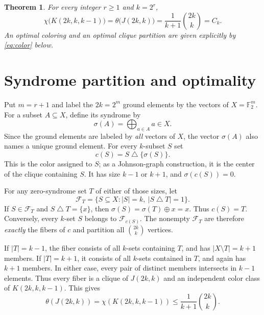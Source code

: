 \documentclass[11pt]{article}
\newtheorem{theorem}{Theorem}
\newcommand{\F}{\mathbb F}
\newcommand{\calF}{\mathcal F}
\newcommand{\sig}{\sigma}
\begin{document}
\begin{theorem}\label{thm:main}
For every integer $r\geq1$ and $k=2^r$,
\[
 \chi\bigl(K(2k,k,k-1)\bigr)
 =\theta\bigl(J(2k,k)\bigr)
 =\frac{1}{k+1}\binom{2k}{k}=C_k.
\]
An optimal coloring and an optimal clique partition are given explicitly by \eqref{eq:color} below.
\end{theorem}

\section{Syndrome partition and optimality}
Put $m=r+1$ and label the $2k=2^m$ ground elements by the vectors of $X=\F_2^m$.  For a subset $A\subseteq X$, define its syndrome by
\[
 \sig(A)=\bigoplus_{a\in A}a\in X.
\]
Since the ground elements are labeled by \emph{all} vectors of $X$, the vector $\sig(A)$ also names a unique ground element.  For every $k$-subset $S$ set
\begin{equation}\label{eq:color}
                 c(S)=S\mathbin{\triangle}\{\sig(S)\}.
\end{equation}
This is the color assigned to $S$; as a Johnson-graph construction, it is the center of the clique containing $S$.  It has size $k-1$ or $k+1$, and $\sig(c(S))=0$.

For any zero-syndrome set $T$ of either of those sizes, let
\[
 \calF_T=\{S\subseteq X: |S|=k,\ |S\mathbin{\triangle}T|=1\}.
\]
If $S\in\calF_T$ and $S\mathbin{\triangle}T=\{x\}$, then
$\sig(S)=\sig(T)\oplus x=x$.  Thus $c(S)=T$.  Conversely, every $k$-set $S$ belongs to $\calF_{c(S)}$.  The nonempty $\calF_T$ are therefore \emph{exactly} the fibers of $c$ and partition all $\binom{2k}{k}$ vertices.

If $|T|=k-1$, the fiber consists of all $k$-sets containing $T$, and has $|X\setminus T|=k+1$ members.  If $|T|=k+1$, it consists of all $k$-sets contained in $T$, and again has $k+1$ members.  In either case, every pair of distinct members intersects in $k-1$ elements.  Thus every fiber is a clique of $J(2k,k)$ and an independent color class of $K(2k,k,k-1)$.  This gives
\begin{equation}\label{eq:upper}
 \theta(J(2k,k))=\chi(K(2k,k,k-1))\leq\frac{1}{k+1}\binom{2k}{k}.
\end{equation}
\end{document}
